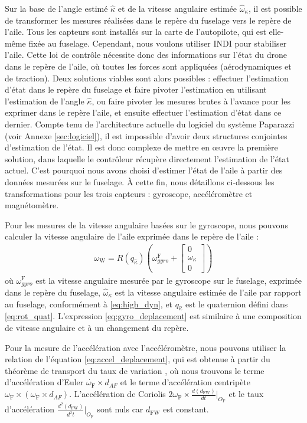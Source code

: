 Sur la base de l'angle estimé $\hat{\kappa}$ et de la vitesse angulaire estimée $\hat{\omega}_{\kappa}$, il est possible de transformer les mesures réalisées dans le repère du fuselage vers le repère de l'aile. Tous les capteurs sont installés sur la carte de l'autopilote, qui est elle-même fixée au fuselage. Cependant, nous voulons utiliser INDI pour stabiliser l'aile. Cette loi de contrôle nécessite donc des informations sur l'état du drone dans le repère de l'aile, où toutes les forces sont appliquées (aérodynamiques et de traction).
Deux solutions viables sont alors possibles : effectuer l'estimation d'état dans le repère du fuselage et faire pivoter l'estimation en utilisant l'estimation de l'angle $\hat{\kappa}$, ou faire pivoter les mesures brutes à l'avance pour les exprimer dans le repère l'aile, et ensuite effectuer l'estimation d'état dans ce dernier. 
Compte tenu de l'architecture actuelle du logiciel du système Paparazzi (voir Annexe \ref{sec:logiciel}), il est impossible d'avoir deux structures conjointes d'estimation de l'état. Il est donc complexe de mettre en œuvre la première solution, dans laquelle le contrôleur récupère directement l'estimation de l'état actuel. C'est pourquoi nous avons choisi d'estimer l'état de l'aile à partir des données mesurées sur le fuselage. À cette fin, nous détaillons ci-dessous les transformations pour les trois capteurs : gyroscope, accéléromètre et magnétomètre. 

Pour les mesures de la vitesse angulaire basées sur le gyroscope, nous pouvons calculer la vitesse angulaire de l'aile exprimée dans le repère de l'aile :
\begin{align}
    \label{eq:gyro_deplacement}
    \omega_{\text{W}} = R(q_{\hat{\kappa}}) \left( \omega_{gyro}^{\text{F}} + \begin{bmatrix}
    0\\ \omega_{\kappa} \\ 0
    \end{bmatrix}  \right) 
\end{align}
où $\omega_{gyro}^{\text{F}}$ est la vitesse angulaire mesurée par le gyroscope sur le fuselage, exprimée dans le repère du fuselage, $\hat{\omega}_{\kappa}$ est la vitesse angulaire estimée de l'aile par rapport au fuselage, conformément à \eqref{eq:high_dyn}, et $q_{\hat{\kappa}}$ est le quaternion défini dans \eqref{eq:rot_quat}.
L'expression \eqref{eq:gyro_deplacement} est similaire à une composition de vitesse angulaire et à un changement du repère.

Pour la mesure de l'accélération avec l'accéléromètre, nous pouvons utiliser la relation de l'équation \eqref{eq:accel_deplacement}, qui est obtenue à partir du théorème de transport du taux de variation \cite{brizard2004motion}, où nous trouvons le terme d'accélération d'Euler $\dot{\omega_{\text{F}}} \times d_{AF}$  et le terme d'accélération centripète $\omega_{\text{F}} \times ( \omega_{\text{F}} \times  d_{AF})$. L'accélération de Coriolis $2\omega_{\text{F}} \times \frac{d (d_{\text{FW}})}{d t}\Bigr|_{O_{\text{F}}}$ et le taux d'accélération $\frac{d^{2} (d_{\text{FW}})}{d^{2} t}\Bigr|_{O_{\text{F}}}$ sont nuls car $d_{\text{FW}}$ est constant.

